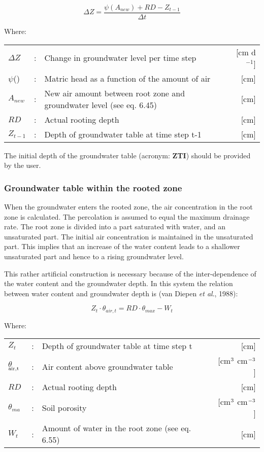 \begin{equation}
\Delta Z = {\frac{\psi (A_{new} ) + RD - Z_{t-1}}{\Delta t}}
\end{equation}

Where:\\[5pt]
\begin{tabularx}{\textwidth}{llXr}
$\Delta Z$ &:& Change in groundwater level per time step  & [cm d$^{ -1}$]\\
$\psi$() &:& Matric head as a function of the amount of air  & [cm]\\
$A_{new}$ &:& New air amount between root zone and groundwater
   level (see eq. 6.45)  & [cm]\\
$RD$ &:& Actual rooting depth  & [cm]\\
$Z_{t-1}$ &:& Depth of groundwater table at time step t-1  & [cm]
\end{tabularx}

The initial depth of the groundwater table (acronym: {\bf ZTI}) should be provided by the
user. 

\subsubsection{Groundwater table within the rooted zone}
When the groundwater enters the rooted zone, the air concentration in the root zone is
calcu\-lated. The percolation is assumed to equal the maximum drainage rate. The root
zone is divided into a part saturated with water, and an unsaturated part. The initial air
concentration is maintained in the unsaturated part. This implies that an increase of the
water content leads to a shallower unsaturated part and hence to a rising groundwater
level.

This rather artificial construction is necessary because of the inter-dependence of the
water content and the groundwater depth. In this system the relation between water
content and groundwater depth is (van Diepen {\it et al\/}., 1988):

\begin{equation}
Z_{t} \cdot \theta_{air,t} = RD \cdot \theta_{max} - W_{t} 
\end{equation}

Where:\\[5pt]
\begin{tabularx}{\textwidth}{llXr}
$Z_{t}$ &:& Depth of groundwater table at time step t  & [cm]\\
$\theta$$_{{\rm air,t}}$ &:& Air content above groundwater table  & [cm$^{{\rm 3}}$ cm$^{{\rm -3}}$]\\
$RD$ &:& Actual rooting depth  & [cm]\\
$\theta_{ma}$ &:& Soil porosity  & [cm$^{{\rm 3}}$ cm$^{{\rm -3}}$]\\
$W_{ t}$ &:& Amount of water in the root zone (see eq. 6.55)  & [cm]\\
\end{tabularx}

